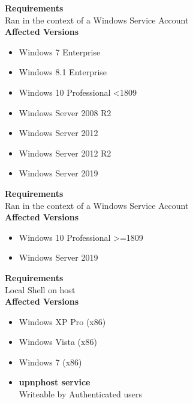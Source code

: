 \documentclass[a4paper,10pt]{article}
\begin{document}
\begin{multicols}{2}
\begin{tcolorbox}[breakable,title=JuicyPotato PrivEsc]
\textbf{Requirements}\\
Ran in the context of a Windows Service Account\\
\newline
\textbf{Affected Versions}
\begin{itemize}
	\itemsep0em
	\item Windows 7 Enterprise
	\item Windows 8.1 Enterprise
	\item Windows 10 Professional <1809
	\item Windows Server 2008 R2
	\item Windows Server 2012
	\item Windows Server 2012 R2
	\item Windows Server 2019
\end{itemize}
\end{tcolorbox}
\begin{tcolorbox}[breakable,title=RoguePotato PrivEsc]
	\textbf{Requirements}\\
	Ran in the context of a Windows Service Account\\
	\newline
	\textbf{Affected Versions}
	\begin{itemize}
		\itemsep0em
		\item Windows 10 Professional >=1809
		\item Windows Server 2019
	\end{itemize}
\end{tcolorbox}
\begin{tcolorbox}[breakable,title=Windows x86 'afd.sys' PrivEsc (MS11-046)]
\textbf{Requirements}\\
Local Shell on host\\
\textbf{Affected Versions}
\begin{itemize}
	\itemsep0em
	\item Windows XP Pro (x86)
	\item Windows Vista (x86)
	\item Windows 7 (x86)
\end{itemize}
\end{tcolorbox}
\begin{tcolorbox}[breakable,title=Windows XP]
\begin{itemize}
	\itemsep0em
	\item \textbf{upnphost service}\\Writeable by Authenticated users
\end{itemize}
\end{tcolorbox}
\begin{tcolorbox}[breakable,title=Windows Vista]
	

\end{tcolorbox}
\end{multicols}
\end{document}
